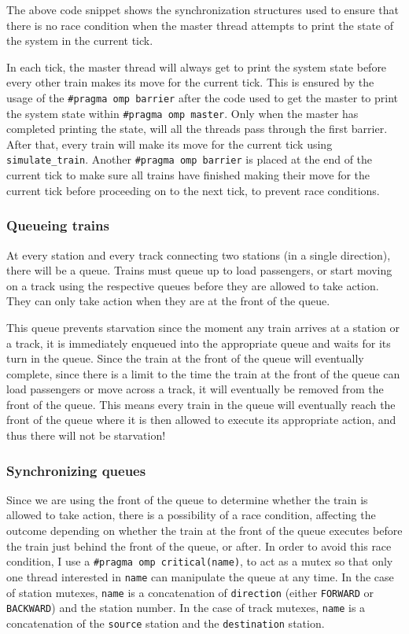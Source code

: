 \documentclass[12pt]{article}
\begin{document}
\bigbreak \noindent The above code snippet shows the synchronization structures used to ensure that there is no race condition when the master thread attempts to print the state of the system in the current tick.

\bigbreak \noindent In each tick, the master thread will always get to print the system state before every other train makes its move for the current tick. This is ensured by the usage of the \verb!#pragma omp barrier! after the code used to get the master to print the system state within \verb!#pragma omp master!. Only when the master has completed printing the state, will all the threads pass through the first barrier. After that, every train will make its move for the current tick using \verb!simulate_train!. Another \verb!#pragma omp barrier! is placed at the end of the current tick to make sure all trains have finished making their move for the current tick before proceeding on to the next tick, to prevent race conditions.

\subsubsection{Queueing trains}

At every station and every track connecting two stations (in a single direction), there will be a queue. Trains must queue up to load passengers, or start moving on a track using the respective queues before they are allowed to take action. They can only take action when they are at the front of the queue.

\bigbreak \noindent This queue prevents starvation since the moment any train arrives at a station or a track, it is immediately enqueued into the appropriate queue and waits for its turn in the queue. Since the train at the front of the queue will eventually complete, since there is a limit to the time the train at the front of the queue can load passengers or move across a track, it will eventually be removed from the front of the queue. This means every train in the queue will eventually reach the front of the queue where it is then allowed to execute its appropriate action, and thus there will not be starvation!

\subsubsection{Synchronizing queues}

Since we are using the front of the queue to determine whether the train is allowed to take action, there is a possibility of a race condition, affecting the outcome depending on whether the train at the front of the queue executes before the train just behind the front of the queue, or after. In order to avoid this race condition, I use a \verb!#pragma omp critical(name)!, to act as a mutex so that only one thread interested in \verb!name! can manipulate the queue at any time. In the case of station mutexes, \verb!name! is a concatenation of \verb!direction! (either \verb!FORWARD! or \verb!BACKWARD!) and the station number. In the case of track mutexes, \verb!name! is a concatenation of the \verb!source! station and the \verb!destination! station.
\end{document}

